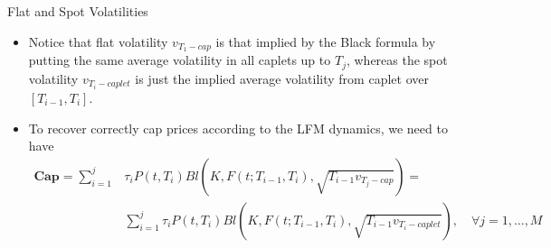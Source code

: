 \documentclass{beamer}
\begin{document}
\begin{frame}{Flat and Spot Volatilities}
	\begin{itemize}
		\item<1-> Notice that flat volatility $v_{T_1-cap}$ is that implied by the Black formula by putting the same average volatility in all caplets up to $T_j$, whereas the spot volatility $v_{T_i-caplet}$ is just the implied average volatility from caplet over $[T_{i-1}, T_i]$.
		\item<2-> To recover correctly cap prices according to the LFM dynamics, we need to have
		\begin{equation*}
			\begin{aligned}
				\textbf{Cap} = \sum_{i=1}^j&\tau_iP(t,T_i)Bl(K,F(t;T_{i-1},T_i),\sqrt{T_{i-1}v_{T_j-cap}}) = \\ &\sum_{i=1}^j\tau_iP(t,T_i)Bl(K,F(t;T_{i-1},T_i),\sqrt{T_{i-1}v_{T_i-caplet}}),\quad \forall j = 1,\dots, M
			\end{aligned}
		\end{equation*}
	\end{itemize}
\end{frame}	

\end{document}
